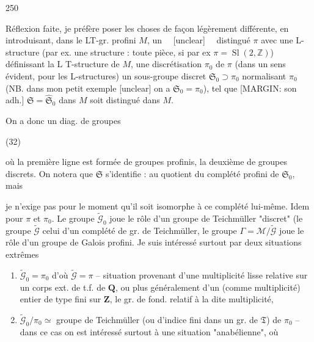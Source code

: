 \newpage


250

Réflexion faite, je préfère poser les choses de
façon légèrement différente, en introduisant,
dans le LT-gr. profini $M$, un ~~[unclear]~~
distingué $\pi$ avec une L-structure (par
ex. une structure : toute pièce,
si par ex $\pi = \operatorname{Sl}(2, \mathbb{Z})$) définissant la
L T-structure de $M$, une discrétisation
$\pi_0$ de $\pi$ (dans un sens évident, pour les
L-structures) un sous-groupe discret
$\mathfrak{S}_0 \supset \pi_0$ normalisant $\pi_0$ (NB. dans mon petit
exemple [unclear] on a $\mathfrak{S}_0 = \pi_0$), tel que
[MARGIN: son adh.] $\mathfrak{S} = \widehat{\mathfrak{S}}_0$ dans $M$ soit distingué dans $M$.

On a donc un diag. de groupes

(32)

où la première ligne est formée de
groupes profinis, la deuxième de groupes
discrets. On notera que $\mathfrak{S}$ s'identifie : au
quotient du complété profini de $\mathfrak{S}_0$, mais

\newpage


je n'exige pas pour le moment qu'il soit
isomorphe à ce complété lui-même. 
Idem pour $\pi$ et $\pi_0$. Le groupe $\tilde{\mathcal{G}}_0$
joue le rôle d'un groupe de Teichmüller
"discret" (le groupe $\tilde{\mathcal{G}}$ celui d'un complété
de gr. de Teichmüller, le groupe
$\Gamma = \mathcal{M} / \tilde{\mathcal{G}}$ joue le rôle d'un groupe de
Galois profini. Je suis intéressé
surtout par deux situations extrêmes

\begin{enumerate}
\item[a)] $\tilde{\mathcal{G}}_0 = \pi_0$ d'où $\tilde{\mathcal{G}} = \pi$ -- situation provenant
d'une multiplicité lisse relative sur
un corps ext. de t.f. de $\mathbf{Q}$, ou
plus généralement d'un (comme multiplicité)
entier de type fini sur $\mathbf{Z}$,
le gr. de fond.
relatif à la dite multiplicité,

\item[b)] $\tilde{\mathcal{G}}_0 / \pi_0 \simeq$ groupe de Teichmüller
(ou d'indice fini dans un gr. de $\mathfrak{T}$)
de $\pi_0$ -- dans ce cas on est intéressé
surtout à une situation "anabélienne", où
\end{enumerate}

